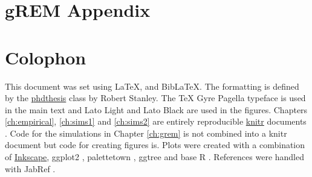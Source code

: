 
\appendix
\chapter{gREM Appendix}
\label{gremAppendix}




\chapter{Colophon}
\label{appendixlabel3}


This document was set using \LaTeX, \XeLaTeX\vspace{1mm} and Bib\LaTeX.
The formatting is defined by the \href{https://github.com/robjstan/latex-phdthesis}{phdthesis} class by Robert Stanley.
The TeX Gyre Pagella typeface is used in the main text and { Lato Light} and { \color[rgb]{0.75,0.75,0.75} Lato Black} are used in the figures.
Chapters \ref{ch:empirical}, \ref{ch:sims1} and \ref{ch:sims2} are entirely reproducible \href{http://yihui.name/knitr/}{knitr} documents \cite{knitr}.
Code for the simulations in Chapter \ref{ch:grem} is not combined into a knitr document but code for creating figures is.
Plots were created with a combination of \href{www.inkscape.org}{Inkscape}, ggplot2 \cite{ggplot2}, palettetown \cite{palettetown}, ggtree \cite{ggtree} and base R \cite{R}.
References were handled with JabRef \cite{JabRef_software}. 

